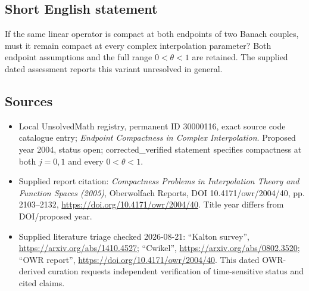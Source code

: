 \documentclass[11pt]{article}
\begin{document}
\subsection{Short English statement}
If the same linear operator is compact at both endpoints of two Banach couples, must it remain compact at every complex interpolation parameter? Both endpoint assumptions and the full range $0<\theta<1$ are retained. The supplied dated assessment reports this variant unresolved in general.
\subsection{Sources}
\begin{itemize}
\item Local UnsolvedMath registry, permanent ID 30000116, exact source code catalogue entry; \emph{Endpoint Compactness in Complex Interpolation}. Proposed year 2004, status open; corrected\_verified statement specifies compactness at both $j=0,1$ and every $0<\theta<1$.
\item Supplied report citation: \emph{Compactness Problems in Interpolation Theory and Function Spaces (2005)}, Oberwolfach Reports, DOI 10.4171/owr/2004/40, pp. 2103--2132, \url{https://doi.org/10.4171/owr/2004/40}. Title year differs from DOI/proposed year.
\item Supplied literature triage checked 2026-08-21: ``Kalton survey'', \url{https://arxiv.org/abs/1410.4527}; ``Cwikel'', \url{https://arxiv.org/abs/0802.3520}; ``OWR report'', \url{https://doi.org/10.4171/owr/2004/40}. This dated OWR-derived curation requests independent verification of time-sensitive status and cited claims.
\end{itemize}
\end{document}
